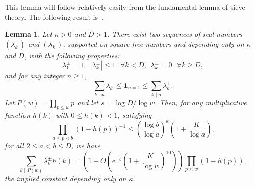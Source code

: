 \documentclass[11pt,letterpaper]{amsart}
\renewcommand{\leq}{\leqslant}
\renewcommand{\geq}{\geqslant}
\newtheorem{lemma}[theorem]{Lemma}
\theoremstyle{definition}
\numberwithin{equation}{section}
\newcommand{\0}{\mathbf{0}}
\begin{document}
This lemma will follow relatively easily from the fundamental lemma of sieve theory. The following result is~\cite[Fundamental lemma~6.3]{iw-kow}.
\begin{lemma} 
\label{lemiwakow}
Let $\kappa>0$ and $D>1$. There exist two sequences of real numbers $(\lambda_k^+)$ and $(\lambda_k^-)$, supported on square-free numbers and depending 
only on $\kappa $ and $D$,
with the following properties: \[ \lambda^\pm_1=1, \ \ 
|\lambda^\pm_k|\leq 1 \ \ \ \forall k<D, 
\
\
\lambda^\pm_k=0\ \ \ \forall k\geq D ,\] and for any integer $n\geq1$,
$$ \sum_{k\mid n } \lambda^-_k\leq \mathbf{1}_{n=1} \leq\sum_{k\mid n }  \lambda^+_k. 
$$ 
Let $P(w)=\prod_{p\leq w}p$ and let $s=\log D/\log w$.
Then, 
for any multiplicative function $h(k)$ with $0\leq h(k)<1$,    satisfying 
$$
\prod_{a\leq p < b}(1-h(p))^{-1} \leq \left(\frac{\log b}{\log a}\right)^\kappa
\left(1+\frac{K}{\log a}\right),
$$
for all $2\leq a<b \leq D$, we have
$$
\sum_{k\mid P(w)} 
\lambda^\pm_k h(k)=
\left(1+O\left(\mathrm e^{-s} \left(1+\frac{K}{\log w} \right)^{10}\right)\right)\prod_{p\leq w } (1-h(p) ),
$$
the implied constant depending only on $\kappa$. 
\end{lemma} 
\end{document}
